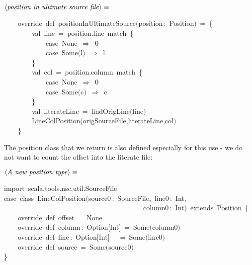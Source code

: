 \documentclass[a4paper,12pt]{article}
\begin{document}
$\left<\mbox{\emph{position in ultimate source file}}\right>\equiv$
\begin{program}~~~~{\vem override}~{\vem def}~positionInUltimateSource$($position\,{\rm :}~Position$)$~=~{\small\{}
\\~~~~~~~~{\vem val}~line~=~position.line~{\vem match}~{\small\{}
\\~~~~~~~~~~~~{\vem case}~None~$\Rightarrow$~0
\\~~~~~~~~~~~~{\vem case}~Some$($l$)$~$\Rightarrow$~l
\\~~~~~~~~{\small\}}
\\~~~~~~~~{\vem val}~col~=~position.column~{\vem match}~{\small\{}
\\~~~~~~~~~~~~{\vem case}~None~$\Rightarrow$~0
\\~~~~~~~~~~~~{\vem case}~Some$($c$)$~$\Rightarrow$~c
\\~~~~~~~~{\small\}}
\\~~~~~~~~{\vem val}~literateLine~=~findOrigLine$($line$)$
\\~~~~~~~~LineColPosition$($origSourceFile,literateLine,col$)$
\\~~~~{\small\}}
\\[0.5em]\end{program}



The position class that we return is also defined especially for this
use - we do not want to count the offset into the literate file:

$\left<\mbox{\emph{A new position type}}\right>\equiv$
\begin{program}{\vem import}~scala.tools.nsc.util.SourceFile
\\{\vem case}~{\vem class}~LineColPosition$($source0\,{\rm :}~SourceFile,~line0\,{\rm :}~Int,
\\~~~~~~~~~~~~~~~~~~~~~~~~~~~~~~~~~~~~~~~~column0\,{\rm :}~Int$)$~{\vem extends}~Position~{\small\{}
\\~~~~{\vem override}~{\vem def}~offset~=~None
\\~~~~{\vem override}~{\vem def}~column\,{\rm :}~Option$[$Int$]$~=~Some$($column0$)$
\\~~~~{\vem override}~{\vem def}~line\,{\rm :}~Option$[$Int$]$~~~=~Some$($line0$)$
\\~~~~{\vem override}~{\vem def}~source~=~Some$($source0$)$
\\{\small\}}
\\[0.5em]\end{program}
\end{document}
